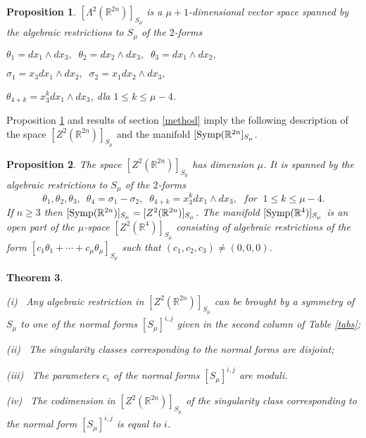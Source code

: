 \documentclass{amsart}
\newtheorem{thm}{Theorem}[section]
\newtheorem{prop}[thm]{Proposition}
\theoremstyle{definition}
\numberwithin{equation}{section}
\begin{document}
\begin{prop}
\label{s-all}
$[\Lambda ^{2}(\mathbb R^{2n})]_{S_{\mu}}$ is a $\mu +1$-dimensional vector space spanned
by the algebraic restrictions to $S_{\mu}$ of the $2$-forms

\smallskip

$\theta _1=dx_1\wedge dx_3,\;\;   \theta _2=dx_2\wedge dx_3, \;\; \theta_3 = dx_1\wedge dx_2,$

\smallskip

$\sigma _1 = x_3dx_1\wedge dx_2,\;\;  \sigma _2 = x_1 dx_2\wedge dx_3, $

\smallskip

$\theta _{4+k}= x_3^kdx_1\wedge dx_3$,\;\; dla $1\leq k\leq \mu-4$.

\end{prop}

Proposition \ref{s-all} and results of section \ref{method}  imply
the following description of the space $[Z^2(\mathbb R^{2n})]_{S_{\mu}}$ and the manifold $[{\rm Symp} (\mathbb R^{2n}]_{S_{\mu}}$.

\begin{prop}
\label{s_baza} The space $[Z^2(\mathbb R^{2n})]_{S_{\mu}}$ has dimension $\mu$.
It is spanned by the algebraic restrictions to $S_{\mu}$ of the $2$-forms
$$\theta _1,\theta_2,\theta _3,\; \ \theta _4 = \sigma _1- \sigma _2,\;\;\theta _{4+k}= x_3^kdx_1\wedge dx_3,\;\; for\;\; 1\leq k\leq \mu-4.$$
If $n\ge 3$ then $[{\rm Symp} (\mathbb R^{2n})]_{S_{\mu}} = [Z^2(\mathbb R^{2n})]_{S_{\mu}}$.
The manifold $[{\rm Symp} (\mathbb R^{4})]_{S_{\mu}}$ is an open part of the $\mu$-space $[Z^2(\mathbb R^{4})]_{S_{\mu}}$
consisting of algebraic restrictions of the form $[c_1\theta _1 + \cdots + c_{\mu}\theta _{\mu}]_{S_{\mu}}$ such that $(c_1,c_2,c_3)\ne (0,0,0)$.
\end{prop}

\begin{thm}
\label{klas_s} $ \ $

\smallskip

\noindent (i) \ Any algebraic restriction in $[Z^2(\mathbb R^{2n})]_{S_{\mu}}$ can be brought by a symmetry of $S_{\mu}$ to one of the normal forms $[S_{\mu}]^{i,j}$ given in the second column of Table \ref{tabs};

\smallskip

\noindent (ii) \ The singularity classes corresponding to the normal forms are disjoint;

\smallskip

\noindent (iii) \ The parameters $c_i$ of the normal forms $[S_{\mu}]^{i,j}$ are moduli.

\smallskip

\noindent (iv)  \ The codimension in $[Z ^2(\mathbb R^{2n})]_{S_{\mu}}$ of the singularity class
corresponding to the normal form  $[S_{\mu}]^{i,j}$ is equal to $i$.

\end{thm}
\end{document}
